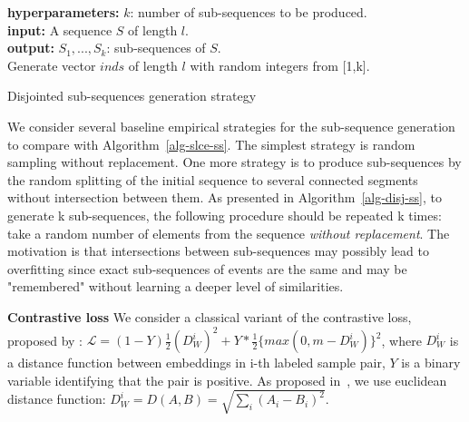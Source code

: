 \documentclass[sigconf]{acmart}
\begin{document}
\begin{algorithm}
\SetAlgoLined
\textbf{hyperparameters:} $k$: number of sub-sequences to be produced. \\
\textbf{input:} A sequence $S$ of length $l$. \\
\textbf{output:} $S_1,...,S_k$: sub-sequences of $S$. \\

\BlankLine
Generate vector $inds$ of length $l$ with random integers from [1,k].\\
\caption{Disjointed sub-sequences generation strategy}
\label{alg-disj-ss}

\end{algorithm}

We consider several baseline empirical strategies for the sub-sequence generation to compare with Algorithm~\ref{alg-slce-ss}. The simplest strategy is random sampling without replacement.
One more strategy is to produce sub-sequences by the random splitting of the initial sequence to several connected segments without intersection between them. As presented in Algorithm~\ref{alg-disj-ss}, to generate k sub-sequences, the following procedure should be repeated k times: take a random number of elements from the sequence \textit{without replacement}. The motivation is that intersections between sub-sequences may possibly lead to overfitting since exact sub-sequences of events are the same and may be "remembered" without learning a deeper level of similarities.





\textbf{Contrastive loss} We consider a classical variant of the contrastive loss, proposed by \citep{Hadsell2006DimensionalityRB}: %
$ \mathcal{L} =  (1-Y)\frac{1}{2}(D_W^i)^2 +Y*\frac{1}{2}\{max(0,m-D_W^i)\}^2 $, where $D_W^i$ is a distance function between embeddings in i-th labeled sample pair, $Y$ is a binary variable identifying that the pair is positive.
As proposed in~\citep{Hadsell2006DimensionalityRB}, we use euclidean distance function: $D_W^i = D(A,B) = \sqrt{\sum_i(A_i - B_i)^2}$.
\end{document}
